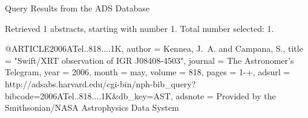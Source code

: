 Query Results from the ADS Database


Retrieved 1 abstracts, starting with number 1.  Total number selected: 1.

@ARTICLE{2006ATel..818....1K,
   author = {{Kennea}, J.~A. and {Campana}, S.},
    title = "{Swift/XRT observation of IGR J08408-4503}",
  journal = {The Astronomer's Telegram},
     year = 2006,
    month = may,
   volume = 818,
    pages = {1-+},
   adsurl = {http://adsabs.harvard.edu/cgi-bin/nph-bib_query?bibcode=2006ATel..818....1K&db_key=AST},
  adsnote = {Provided by the Smithsonian/NASA Astrophysics Data System}
}


